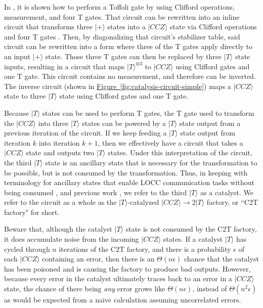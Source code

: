\documentclass[superscriptaddress,notitlepage,longbibliography]{revtex4-1}
\newcommand{\fig}[1]{\hyperref[fig:#1]{Figure~\ref*{fig:#1}}}
\begin{document}
In \cite{jones2013}, it is shown how to perform a Toffoli gate by using Clifford operations, measurement, and four T gates.
That circuit can be rewritten into an inline circuit that transforms three $|+\rangle$ states into a $|CCZ\rangle$ state via Clifford operations and four T gates \cite{gidney2018}.
Then, by diagonalizing that circuit's stabilizer table, said circuit can be rewritten into a form where three of the T gates apply directly to an input $|+\rangle$ state.
Those three T gates can then be replaced by three $|T\rangle$ state inputs, resulting in a circuit that maps $|T\rangle^{\otimes 3}$ to $|CCZ\rangle$ using Clifford gates and one T gate.
This circuit contains no measurement, and therefore can be inverted.
The inverse circuit (shown in \fig{catalysis-circuit-simple}) maps a $|CCZ\rangle$ state to three $|T\rangle$ state using Clifford gates and one T gate.

Because $|T\rangle$ states can be used to perform T gates, the T gate used to transform the $|CCZ\rangle$ into three $|T\rangle$ states can be powered by a $|T\rangle$ state output from a previous iteration of the circuit.
If we keep feeding a $|T\rangle$ state output from iteration $k$ into iteration $k+1$, then we effectively have a circuit that takes a $|CCZ\rangle$ state and outputs two $|T\rangle$ states.
Under this interpretation of the circuit, the third $|T\rangle$ state is an ancillary state that is necessary for the transformation to be possible, but is not consumed by the transformation.
Thus, in keeping with terminology for ancillary states that enable LOCC communication tasks without being consumed \cite{jonathan1999}, and previous work \cite{campbell2011catalysis}, we refer to the third $|T\rangle$ as a catalyst.
We refer to the circuit as a whole as the $|T\rangle$-catalyzed $|CCZ\rangle \rightarrow 2|T\rangle$ factory, or ``C2T factory" for short.

Beware that, although the catalyst $|T\rangle$ state is not consumed by the C2T factory, it does accumulate noise from the incoming $|CCZ\rangle$ states.
If a catalyst $|T\rangle$ has cycled through $n$ iterations of the C2T factory, and there is a probability $\epsilon$ of each $|CCZ\rangle$ containing an error, then there is an $\Theta(n \epsilon)$ chance that the catalyst has been poisoned and is causing the factory to produce bad outputs.
However, because every error in the catalyst ultimately traces back to an error in a $|CCZ\rangle$ state, the chance of there being {\em any} error grows like $\Theta(n \epsilon)$, instead of $\Theta(n^2 \epsilon)$ as would be expected from a naive calculation assuming uncorrelated errors.
\end{document}
